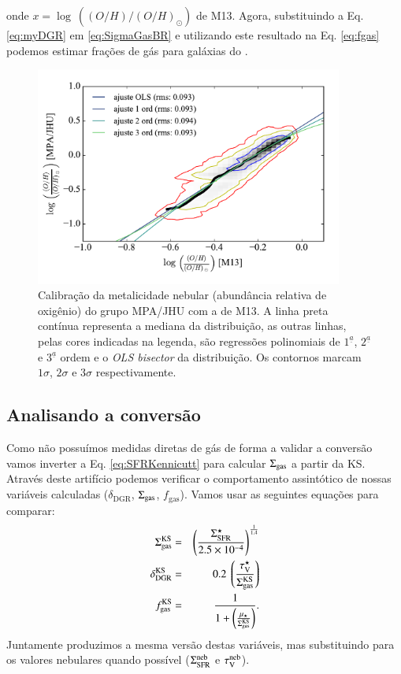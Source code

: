 \noindent onde $x = \log\ ((O/H)/(O/H)_\odot)$ de M13. Agora, substituindo a Eq. \ref{eq:myDGR} em
\ref{eq:SigmaGasBR} e utilizando este resultado na Eq. \ref{eq:fgas} podemos estimar frações de
gás para galáxias do \CAL. 
\begin{figure}
	\centering
	\includegraphics[width=0.9\textwidth]{figuras/logOH_ZnebMPA.pdf}
	\caption[Calibração das metalicidades.]
	{Calibração da metalicidade nebular (abundância relativa de oxigênio) do grupo MPA/JHU com a de
M13. A linha preta contínua representa a mediana da distribuição, as outras linhas, pelas cores
indicadas na legenda, são regressões polinomiais de $1^\underline{a}$, $2^\underline{a}$ e
$3^\underline{a}$ ordem e o {\em OLS bisector} da distribuição. Os contornos marcam $1\sigma$,
$2\sigma$ e $3\sigma$ respectivamente.}
	\label{fig:calibZ}
\end{figure}

\subsection{Analisando a conversão}
\label{sec:gasfrac:gas2dust:analisradperf}

Como não possuímos medidas diretas de gás de forma a validar a conversão vamos inverter a Eq.
\ref{eq:SFRKennicutt} para calcular $\Sigma_{\mathrm{gas}}$ a partir da KS. Através deste artifício podemos
verificar o comportamento assintótico de nossas variáveis calculadas ($\delta_{\mathrm{DGR}}$,
$\Sigma_{\mathrm{gas}}$, $f_{\mathrm{gas}}$). Vamos usar as seguintes equações para comparar:
\begin{eqnarray}
	\SigmaGas^{\mathrm{KS}} &=& \left(\frac{\SigmaSFR}{2.5 \times 10^{-4}}\right)^{\frac{1}{1.4}} \\
	\label{eq:SigmaGasKenn}
	\delta_{\mathrm{DGR}}^{\mathrm{KS}} &=& 0.2\ \left(\frac{\tauVS}{\SigmaGas^{\mathrm{KS}}}\right) \\
	\label{eq:DeltaDGRKenn}
	f_{\mathrm{gas}}^{\mathrm{KS}} &=& \frac{1}{1 +
	\left(\frac{\mu_\star}{\SigmaGas^{\mathrm{KS}}}\right)}.
	\label{eq:fGasKenn}
\end{eqnarray}
\noindent Juntamente produzimos a mesma versão destas variáveis, mas substituindo para os valores
nebulares quando possível ($\Sigma_{\mathrm{SFR}}^{\mathrm{neb}}$ e $\tau_{\mathrm{V}}^{\mathrm{neb}}$).

